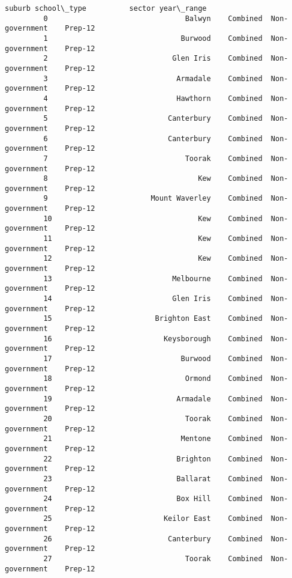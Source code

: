 \documentclass[11pt]{article}
\begin{document}
\begin{Verbatim}[commandchars=\\\{\}]
                                          suburb school\_type          sector year\_range  
         0                                Balwyn    Combined  Non-government    Prep-12  
         1                               Burwood    Combined  Non-government    Prep-12  
         2                             Glen Iris    Combined  Non-government    Prep-12  
         3                              Armadale    Combined  Non-government    Prep-12  
         4                              Hawthorn    Combined  Non-government    Prep-12  
         5                            Canterbury    Combined  Non-government    Prep-12  
         6                            Canterbury    Combined  Non-government    Prep-12  
         7                                Toorak    Combined  Non-government    Prep-12  
         8                                   Kew    Combined  Non-government    Prep-12  
         9                        Mount Waverley    Combined  Non-government    Prep-12  
         10                                  Kew    Combined  Non-government    Prep-12  
         11                                  Kew    Combined  Non-government    Prep-12  
         12                                  Kew    Combined  Non-government    Prep-12  
         13                            Melbourne    Combined  Non-government    Prep-12  
         14                            Glen Iris    Combined  Non-government    Prep-12  
         15                        Brighton East    Combined  Non-government    Prep-12  
         16                          Keysborough    Combined  Non-government    Prep-12  
         17                              Burwood    Combined  Non-government    Prep-12  
         18                               Ormond    Combined  Non-government    Prep-12  
         19                             Armadale    Combined  Non-government    Prep-12  
         20                               Toorak    Combined  Non-government    Prep-12  
         21                              Mentone    Combined  Non-government    Prep-12  
         22                             Brighton    Combined  Non-government    Prep-12  
         23                             Ballarat    Combined  Non-government    Prep-12  
         24                             Box Hill    Combined  Non-government    Prep-12  
         25                          Keilor East    Combined  Non-government    Prep-12  
         26                           Canterbury    Combined  Non-government    Prep-12  
         27                               Toorak    Combined  Non-government    Prep-12  

\end{Verbatim}
\end{document}
